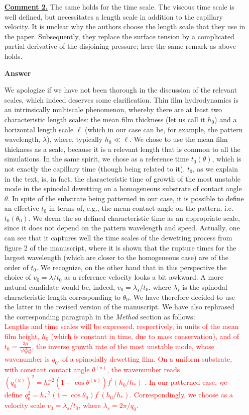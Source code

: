 \documentclass[12pt,english]{article}
\begin{document}
\begin{itemize}
\item[ \textbf{\underline{Comment 2.}}] 
{
The same holds for the time scale. 
The viscous time scale is well defined, but necessitates a length scale in addition to the 
capillary velocity. It is unclear why the authors choose the length scale that they use in the paper.
Subsequently, they replace the surface tension by a complicated partial derivative of the 
disjoining pressure; here the same remark as above holds.
}

\item[ \textbf{{Answer}}]
{
We apologize if we have not been thorough in the discussion of the relevant scales, which indeed deserves some clarification. 
Thin film hydrodynamics is an intrinsically multiscale phenomenon, whereby there are at least two characteristic length scales: the mean film thickness (let us call it $h_0$)
and a horizontal length scale $\ell$ (which in our case can be, for example, the pattern wavelength, $\lambda$), where, typically $h_0 \ll \ell$. We chose to use the mean 
film thickness as a scale, because it is a relevant length that is common to all the simulations.
In the same spirit, we chose as a reference time $t_0(\theta)$, which is not exactly the capillary time (though being related to it). 
$t_0$, as we explain in the text, is, in fact, the characteristic time of growth of the most unstable mode in the spinodal dewetting on a homogeneous
substrate of contact angle $\theta$. In spite of the substrate being patterned in our case, it is possible to define an effective $t_0$ in terms 
of, e.g., the mean contact angle on the pattern, i.e. $t_0(\theta_0)$. 
We deem the so defined characteristic time as an appropriate scale,
since it does not depend on the pattern wavelength and speed. Actually, one can see that it captures well the time scales of the dewetting process
from figure 2 of the manuscript, where it is shown that the rupture times for the largest wavelength (which are closer to the homogeneous case) are of the order of $t_0$.
We recognize, on the other hand that in this perspective the choice of $v_0 = \lambda/t_0$ as a reference velocity looks a bit awkward.
A more natural candidate would be, indeed, $v_0=\lambda_s/t_0$, where $\lambda_s$ is the spinodal 
characteristic length corresponding to $\theta_0$. We have therefore decided to use the latter in the revised version of the manuscript.
We have also rephrased the corresponding paragraph in the {\it Method} section as follows: \\

\textcolor{red}{Lengths and time scales will be expressed, respectively, in units of the mean film height, $h_0$ (which is constant in time, due to mass conservation), and of $t_0 = \frac{3\mu}{\gamma h_0^3 q_0^4}$, the inverse growth rate of the most unstable mode, whose wavenumber is $q_0$, of a spinodally dewetting film. On a uniform substrate, with constant contact angle $\theta^{(u)}$, the wavenumber reads 
$(q^{(u)}_0)^2 = h_{\ast}^{-2}(1-\cos \theta^{(u)})f^{\prime}(h_0/h_{\ast})$ \cite{Mecke_2005,PhysRevE.100.023108}. In our patterned case, we define 
$q_0^2=h_{\ast}^{-2}(1-\cos\theta_0)f^{\prime}(h_0/h_{\ast})$.
Correspondingly, we choose as a velocity scale $v_0 = \lambda_s/t_0$, where $\lambda_s = 2\pi/q_0$.}

}
\end{itemize}
\end{document}
